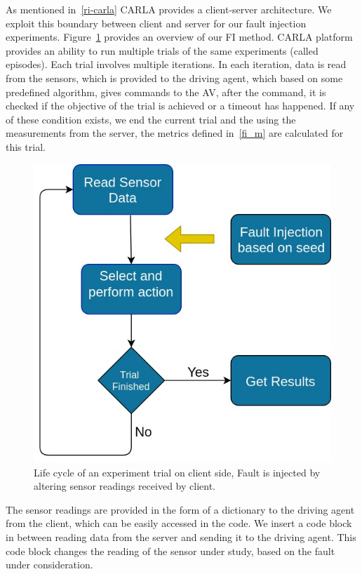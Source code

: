 As mentioned in~\ref{ri-carla} CARLA provides a client-server architecture. We exploit this boundary between client and server for our fault injection experiments. Figure~\ref{fig:FI_method} provides an overview of our FI method. CARLA platform provides an ability to run multiple trials of the same experiments (called episodes). Each trial involves multiple iterations. In each iteration, data is read from the sensors, which is provided to the driving agent, which based on some predefined algorithm, gives commands to the AV, after the command, it is checked if the objective of the trial is achieved or a timeout has happened. If any of these condition exists, we end the current trial and the using the measurements from the server, the metrics defined in~\ref{fi_m} are calculated for this trial.

 \begin{figure}  
 	\vspace{-0.5em}
 	\centering
 	\includegraphics[scale=0.3]{FI_method}
 	\vspace{-0.5em}
 	\caption{Life cycle of an experiment trial on client side, Fault is injected by altering sensor readings received by client.}
 	\label{fig:FI_method}
 	\vspace{-1.5em}
 \end{figure}
 
The sensor readings are provided in the form of a dictionary to the driving agent from the client, which can be easily accessed in the code. We insert a code block in between reading data from the server and sending it to the driving agent. This code block changes the reading of the sensor under study, based on the fault under consideration.

